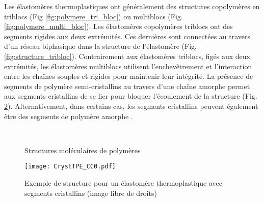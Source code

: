 Les élastomères thermoplastiques ont généralement des structures copolymères en triblocs (Fig \ref{fig:polymere_tri_bloc}) ou multiblocs (Fig. \ref{fig:polymere_multi_bloc}). 
Les élastomères copolymères triblocs ont des segments rigides aux deux extrémités. 
Ces dernières sont connectées au travers d'un réseau biphasique dans la structure de l'élastomère (Fig. \ref{fig:structure_tribloc}). 
Contrairement aux élastomères triblocs, figés aux deux extrémités, les élastomères multiblocs utilisent l'enchevêtrement et l'interaction entre les chaînes souples et rigides pour maintenir leur intégrité. 
La présence de segments de polymère semi-cristallins au travers d'une chaîne amorphe permet aux segments cristallins de se lier pour bloquer l'écoulement de la structure (Fig. \ref{fig:structure_TPECryst}). 
Alternativement, dans certains cas, les segments cristallins peuvent également être des segments de polymère amorphe \cite{Holden2002}. 

\vspace{6pt}
\begin{figure}[h]
	\subfigcapskip=6pt
	\centering
	 \quad
	 \\ \vspace{6pt}
	\caption{Structures moléculaires de polymères}
	\label{fig:polymere_structure}
\end{figure}

\begin{figure}[h]
	\centering
	\texttt{[image: CrystTPE\_CC0.pdf]}
	\caption{Exemple de structure pour un élastomère thermoplastique avec segments cristallins (image libre de droits)}
	\label{fig:structure_TPECryst}
\end{figure}

